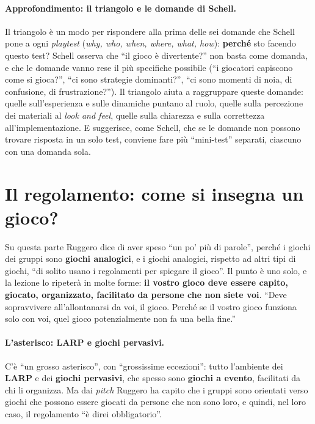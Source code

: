 \paragraph{Approfondimento: il triangolo e le domande di Schell.} Il triangolo è un modo
per rispondere alla prima delle sei domande che Schell pone a ogni \emph{playtest}
(\emph{why, who, when, where, what, how}): \textbf{perché} sto facendo questo test? Schell
osserva che ``il gioco è divertente?'' non basta come domanda, e che le domande vanno
rese il più specifiche possibile (``i giocatori capiscono come si gioca?'', ``ci sono
strategie dominanti?'', ``ci sono momenti di noia, di confusione, di frustrazione?''). Il
triangolo aiuta a raggruppare queste domande: quelle sull'esperienza e sulle dinamiche
puntano al ruolo, quelle sulla percezione dei materiali al \emph{look and feel}, quelle
sulla chiarezza e sulla correttezza all'implementazione. E suggerisce, come Schell, che
se le domande non possono trovare risposta in un solo test, conviene fare più
``mini-test'' separati, ciascuno con una domanda sola.

\section{Il regolamento: come si insegna un gioco?}
\label{a12:sec:insegnare}

Su questa parte Ruggero dice di aver speso ``un po' più di parole'', perché i giochi
dei gruppi sono \textbf{giochi analogici}, e i giochi analogici, rispetto ad altri tipi
di giochi, ``di solito usano i regolamenti per spiegare il gioco''. Il punto è uno solo,
e la lezione lo ripeterà in molte forme: \textbf{il vostro gioco deve essere capito,
giocato, organizzato, facilitato da persone che non siete voi}. ``Deve sopravvivere
all'allontanarsi da voi, il gioco. Perché se il vostro gioco funziona solo con voi,
quel gioco potenzialmente non fa una bella fine.''

\paragraph{L'asterisco: LARP e giochi pervasivi.} C'è ``un grosso asterisco'', con
``grossissime eccezioni'': tutto l'ambiente dei \textbf{LARP} e dei \textbf{giochi
pervasivi}, che spesso sono \textbf{giochi a evento}, facilitati da chi li organizza. Ma
dai \emph{pitch} Ruggero ha capito che i gruppi sono orientati verso giochi che possono
essere giocati da persone che non sono loro, e quindi, nel loro caso, il regolamento ``è
direi obbligatorio''.


